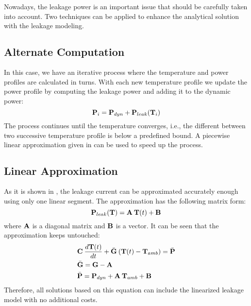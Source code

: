 Nowadays, the leakage power is an important issue that should be carefully taken into account. Two techniques can be applied to enhance the analytical solution with the leakage modeling.

\subsection{Alternate Computation}
In this case, we have an iterative process where the temperature and power profiles are calculated in turns. With each new temperature profile we update the power profile by computing the leakage power and adding it to the dynamic power:
\[
  \mathbf{P}_i = \mathbf{P}_{dyn} + \mathbf{P}_{leak}(\mathbf{T}_i)
\]
The process continues until the temperature converges, i.e., the different between two successive temperature profile is below a predefined bound. A piecewise linear approximation given in \cite{liu2007} can be used to speed up the process.

\subsection{Linear Approximation}
As it is shown in \cite{liu2007}, the leakage current can be approximated accurately enough using only one linear segment. The approximation has the following matrix form:
\[
  \mathbf{P}_{leak}(\mathbf{T}) = \mathbf{A} \: \mathbf{T}(t) + \mathbf{B}
\]
where $\mathbf{A}$ is a diagonal matrix and $\mathbf{B}$ is a vector. It can be seen that the approximation keeps  untouched:
\begin{align*}
  & \mathbf{C} \: \frac{d\mathbf{T}(t)}{dt} + \bar{\mathbf{G}} \: (\mathbf{T}(t) - \mathbf{T}_{amb}) = \bar{\mathbf{P}} \\
  & \bar{\mathbf{G}} = \mathbf{G} - \mathbf{A} \\
  & \bar{\mathbf{P}} = \mathbf{P}_{dyn} + \mathbf{A} \: \mathbf{T}_{amb} + \mathbf{B}
\end{align*}
Therefore, all solutions based on this equation can include the linearized leakage model with no additional costs.
